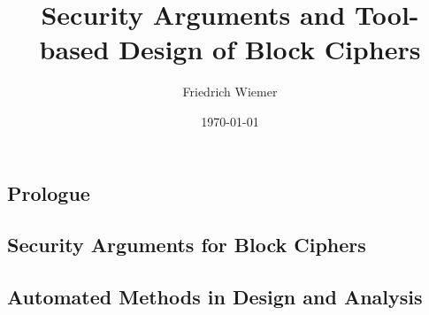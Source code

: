 \documentclass{dissertation}
\title{Security Arguments and Tool-based Design of Block Ciphers}
\author{Friedrich Wiemer}
\date{\today}
\begin{document}
\frontmatter{}


\fontsize{9pt}{13pt}\selectfont


\blankpage{}

\blankpage{}

\tableofcontents*
\clearpage{}

\listofalgorithms
\vspace{\baselineskip}

\listoffigures*
\vspace{\baselineskip}
\clearpage{}

\listoftables*
\clearpage{}

%

\mainmatter{}
\begin{fullwidth}
\part{Prologue}
\end{fullwidth}

\cleardoublepage{}

%
%
%
%
%




\begin{fullwidth}
\part{Security Arguments for Block Ciphers}
\end{fullwidth}




\begin{fullwidth}
\part{Automated Methods in Design and Analysis}
\end{fullwidth}
\end{document}
